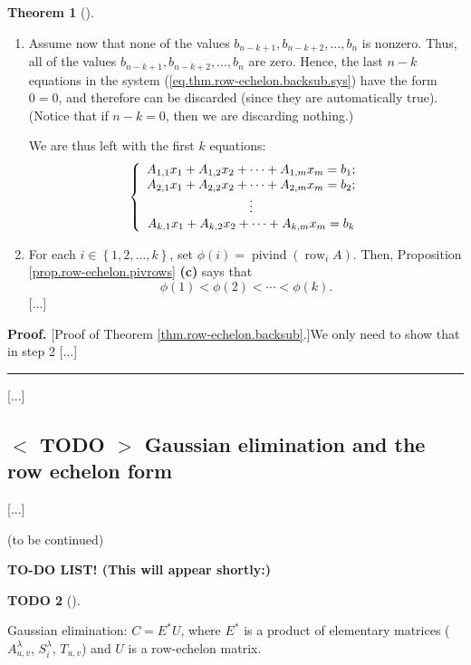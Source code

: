 \documentclass[numbers=enddot,12pt,final,onecolumn,notitlepage]{scrartcl}%
\theoremstyle{definition}
\newtheorem{theo}{Theorem}[section]
\newenvironment{theorem}[1][]
{\begin{theo}[#1]\begin{leftbar}}
{\end{leftbar}\end{theo}}
\newtheorem{quest}[theo]{TODO}
\newenvironment{todo}[1][]
{\begin{quest}[#1]\begin{leftbar}}
{\end{leftbar}\end{quest}}
\newenvironment{proof}[1][Proof]{\noindent\textbf{#1.} }{\ \rule{0.5em}{0.5em}}
\begin{document}
\begin{theorem}
\begin{enumerate}
\item Assume now that none of the values $b_{n-k+1},b_{n-k+2},\ldots,b_{n}$ is
nonzero. Thus, all of the values $b_{n-k+1},b_{n-k+2},\ldots,b_{n}$ are zero.
Hence, the last $n-k$ equations in the system
(\ref{eq.thm.row-echelon.backsub.sys}) have the form $0=0$, and therefore can
be discarded (since they are automatically true). (Notice that if $n-k=0$,
then we are discarding nothing.)

We are thus left with the first $k$ equations:%
\begin{equation}
\left\{
\begin{array}
[c]{c}%
A_{1,1}x_{1}+A_{1,2}x_{2}+\cdots+A_{1,m}x_{m}=b_{1};\\
A_{2,1}x_{1}+A_{2,2}x_{2}+\cdots+A_{2,m}x_{m}=b_{2};\\
\vdots\\
A_{k,1}x_{1}+A_{k,2}x_{2}+\cdots+A_{k,m}x_{m}=b_{k}%
\end{array}
\right.  \label{eq.thm.row-echelon.backsub.sysk}%
\end{equation}


\item For each $i\in\left\{  1,2,\ldots,k\right\}  $, set $\phi\left(
i\right)  =\operatorname*{pivind}\left(  \operatorname*{row}\nolimits_{i}%
A\right)  $. Then, Proposition \ref{prop.row-echelon.pivrows} \textbf{(c)}
says that%
\[
\phi\left(  1\right)  <\phi\left(  2\right)  <\cdots<\phi\left(  k\right)  .
\]
[...]
\end{enumerate}
\end{theorem}

\begin{proof}
[Proof of Theorem \ref{thm.row-echelon.backsub}.]We only need to show that in
step 2 [...]
\end{proof}

[...]

\subsection{\label{sect.gauss.gauss}%
$<$%
TODO%
$>$
Gaussian elimination and the row echelon form}

[...]

(to be continued)

\textbf{TO-DO LIST! (This will appear shortly:)}

\begin{todo}
Gaussian elimination: $C=E^{\ast}U$, where $E^{\ast}$ is a product of
elementary matrices ($A_{u,v}^{\lambda}$, $S_{i}^{\lambda}$, $T_{u,v}$) and
$U$ is a row-echelon matrix.
\end{todo}
\end{document}
